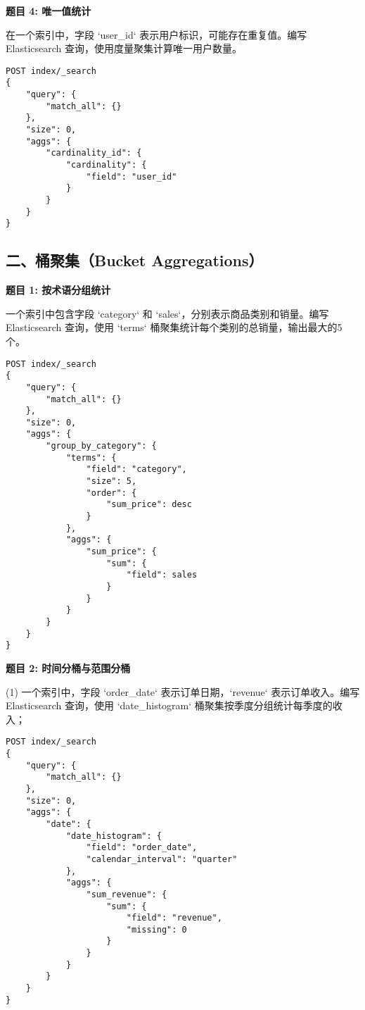 \documentclass[12pt]{article}
\begin{document}
\textbf{题目 4: 唯一值统计}  

在一个索引中，字段 `user\_id` 表示用户标识，可能存在重复值。编写 Elasticsearch 查询，使用度量聚集计算唯一用户数量。

\begin{verbatim}
POST index/_search
{
    "query": {
        "match_all": {}
    },
    "size": 0,
    "aggs": {
        "cardinality_id": {
            "cardinality": {
                "field": "user_id"
            }
        }
    }
}
\end{verbatim}

\subsection*{二、桶聚集（Bucket Aggregations）}

\textbf{题目 1: 按术语分组统计}  

一个索引中包含字段 `category` 和 `sales`，分别表示商品类别和销量。编写 Elasticsearch 查询，使用 `terms` 桶聚集统计每个类别的总销量，输出最大的5个。

\begin{verbatim}
POST index/_search
{
    "query": {
        "match_all": {}
    },
    "size": 0,
    "aggs": {
        "group_by_category": {
            "terms": {
                "field": "category",
                "size": 5,
                "order": {
                    "sum_price": desc
                }
            },
            "aggs": {
                "sum_price": {
                    "sum": {
                        "field": sales
                    }
                }
            }
        }
    }
}
\end{verbatim}


\textbf{题目 2: 时间分桶与范围分桶}  

(1) 一个索引中，字段 `order\_date` 表示订单日期，`revenue` 表示订单收入。编写 Elasticsearch 查询，使用 `date\_histogram` 桶聚集按季度分组统计每季度的收入； \\
\begin{verbatim}
POST index/_search
{
    "query": {
        "match_all": {}
    },
    "size": 0,
    "aggs": {
        "date": {
            "date_histogram": {
                "field": "order_date",
                "calendar_interval": "quarter"
            },
            "aggs": {
                "sum_revenue": {
                    "sum": {
                        "field": "revenue",
                        "missing": 0
                    }
                }
            }
        }        
    }
}
\end{verbatim}
\end{document}
